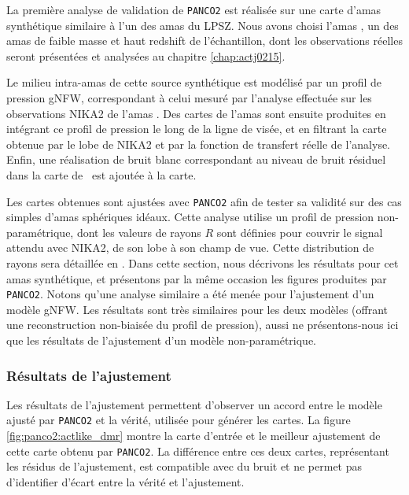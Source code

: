 La première analyse de validation de \texttt{PANCO2} est réalisée sur une carte d'amas synthétique similaire à l'un des amas du LPSZ.
Nous avons choisi l'amas \act, un des amas de faible masse et haut redshift de l'échantillon, dont les observations réelles seront présentées et analysées au chapitre \ref{chap:actj0215}.

Le milieu intra-amas de cette source synthétique est modélisé par un profil de pression gNFW, correspondant à celui mesuré par l'analyse effectuée sur les observations NIKA2 de l'amas \cite{keruzore_exploiting_2020}.
Des cartes de l'amas sont ensuite produites en intégrant ce profil de pression le long de la ligne de visée, et en filtrant la carte obtenue par le lobe de NIKA2 et par la fonction de transfert réelle de l'analyse.
Enfin, une réalisation de bruit blanc correspondant au niveau de bruit résiduel dans la carte de \act\ est ajoutée à la carte.

Les cartes obtenues sont ajustées avec \texttt{PANCO2} afin de tester sa validité sur des cas simples d'amas sphériques idéaux.
Cette analyse utilise un profil de pression non-paramétrique, dont les valeurs de rayons $R$ sont définies pour couvrir le signal attendu avec NIKA2, de son lobe à son champ de vue.
Cette distribution de rayons sera détaillée en .
Dans cette section, nous décrivons les résultats pour cet amas synthétique, et présentons par la même occasion les figures produites par \texttt{PANCO2}.
Notons qu'une analyse similaire a été menée pour l'ajustement d'un modèle gNFW.
Les résultats sont très similaires pour les deux modèles (offrant une reconstruction non-biaisée du profil de pression), aussi ne présentons-nous ici que les résultats de l'ajustement d'un modèle non-paramétrique.

\subsubsection{Résultats de l'ajustement} %
Les résultats de l'ajustement permettent d'observer un accord entre le modèle ajusté par \texttt{PANCO2} et la vérité, utilisée pour générer les cartes.
La figure \ref{fig:panco2:actlike_dmr} montre la carte d'entrée et le meilleur ajustement de cette carte obtenu par \texttt{PANCO2}.
La différence entre ces deux cartes, représentant les résidus de l'ajustement, est compatible avec du bruit et ne permet pas d'identifier d'écart entre la vérité et l'ajustement.

